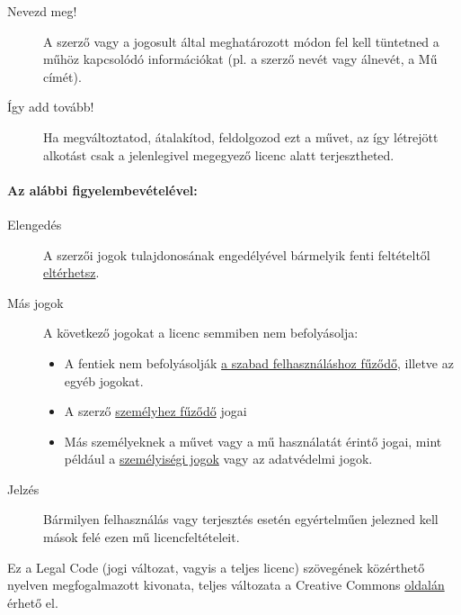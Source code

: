 \documentclass[a4paper, titlepage]{report}
\begin{document}
\begin{description}
 \item[Nevezd meg!] A szerző vagy a jogosult által meghatározott módon fel kell tüntetned a műhöz kapcsolódó információkat (pl. a szerző nevét vagy álnevét, a Mű címét).
 \item[Így add tovább!] Ha megváltoztatod, átalakítod, feldolgozod ezt a művet, az így létrejött alkotást csak a jelenlegivel megegyező licenc alatt terjesztheted.
\end{description}

\paragraph{Az alábbi figyelembevételével:}

\begin{description}
 \item[Elengedés] A szerzői jogok tulajdonosának engedélyével bármelyik fenti feltételtől \href{http://creativecommons.org/licenses/by-sa/2.5/hu/#}{eltérhetsz}.
 \item[Más jogok] A következő jogokat a licenc semmiben nem befolyásolja:
 \begin{itemize}
  \item A fentiek nem befolyásolják \href{http://wiki.creativecommons.org/Frequently_Asked_Questions#Do_Creative_Commons_licenses_affect_fair_use.2C_fair_dealing_or_other_exceptions_to_copyright.3F}{a szabad felhasználáshoz fűződő}, illetve az egyéb jogokat.
  \item A szerző \href{http://wiki.creativecommons.org/Frequently_Asked_Questions#I_don.E2.80.99t_like_the_way_a_person_has_used_my_work_in_a_derivative_work_or_included_it_in_a_collective_work.3B_what_can_I_do.3F}{személyhez fűződő} jogai
  \item Más személyeknek a művet vagy a mű használatát érintő jogai, mint például a \href{http://wiki.creativecommons.org/Frequently_Asked_Questions#When_are_publicity_rights_relevant.3F}{személyiségi jogok} vagy az adatvédelmi jogok.
 \end{itemize}
 \item[Jelzés] Bármilyen felhasználás vagy terjesztés esetén egyértelműen jelezned kell mások felé ezen mű licencfeltételeit. 
\end{description}

Ez a Legal Code (jogi változat, vagyis a teljes licenc) szövegének közérthető nyelven megfogalmazott kivonata, teljes változata a Creative Commons \href{http://creativecommons.org/licenses/by-sa/2.5/hu/legalcode}{oldalán} érhető el.

\newpage
{}
\printindex

\newpage
{}
\listoftables

\newpage
{}
\listoffigures

\newpage
{}
\lstlistoflistings

\newpage
{}


\end{document}
